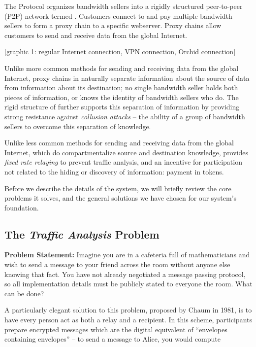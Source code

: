 The \Orchid{} Protocol organizes bandwidth sellers into a rigidly
structured peer-to-peer (P2P) network termed \tOM{}. Customers connect to
\tOM{} and pay multiple bandwidth sellers to form a proxy chain to a
specific webserver. Proxy chains allow customers to send and receive
data from the global Internet.

[graphic 1: regular Internet connection, VPN connection, Orchid connection]

Unlike more common methods for sending and receiving data from the
global Internet, proxy chains in \tOM{} naturally separate information
about the source of data from information about its destination; no
single bandwidth seller holds both pieces of information, or knows the
identity of bandwidth sellers who do. The rigid structure of \tOM{}
further supports this separation of information by providing strong
resistance against \emph{collusion attacks} -- the ability of a group
of bandwidth sellers to overcome this separation of knowledge.

Unlike less common methods for sending and receiving data from the
global Internet, which do compartmentalize source and destination
knowledge, \tOM{} provides \emph{fixed rate relaying} to prevent
traffic analysis, and an incentive for participation not related to
the hiding or discovery of information: payment in tokens.

Before we describe the details of the system, we will briefly review
the core problems it solves, and the general solutions we have chosen
for our system's foundation.

\subsection{The \emph{Traffic Analysis} Problem}

\textbf{Problem Statement:} Imagine you are in a cafeteria full of
mathematicians and wish to send a message to your friend across the
room without anyone else knowing that fact. You have not already
negotiated a message passing protocol, so all implementation details
must be publicly stated to everyone the room. What can be done?

A particularly elegant solution to this problem, proposed by Chaum in
1981\cite{chaum-mix}, is to have every person act as both a relay and
a recipient. In this scheme, participants prepare encrypted messages
which are the digital equivalent of ``envelopes containing envelopes''
-- to send a message to Alice, you would compute

